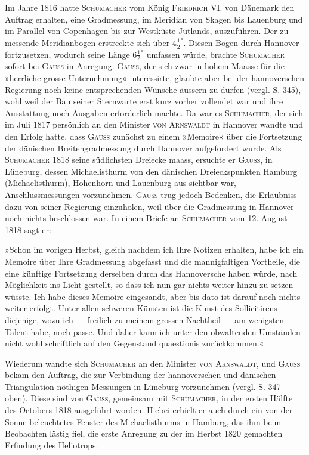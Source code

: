\par\noindent\hspace*{\parindent}Im Jahre 1816 hatte \textsc{Schumacher} vom König \textsc{Friedrich} VI. von Dänemark den Auftrag erhalten, eine Gradmessung, im Meridian von Skagen bis Lauenburg und im Parallel von Copenhagen bis zur Westküste Jütlands, auszuführen. Der zu messende Meridianbogen erstreckte sich über $4\frac12^\circ$. Diesen Bogen durch Hannover fortzusetzen, wodurch seine Länge $6\frac12^\circ$ umfassen würde, brachte \textsc{Schumacher} sofort bei \textsc{Gauss} in Anregung. \textsc{Gauss}, der sich zwar in hohem Maasse für die »herrliche grosse Unternehmung« interessirte, glaubte aber bei der hannoverschen Regierung noch keine entsprechenden Wünsche äussern zu dürfen (vergl. S. 345), wohl weil der Bau seiner Sternwarte erst kurz vorher vollendet war und ihre Ausstattung noch Ausgaben erforderlich machte. Da war es \textsc{Schumacher}, der sich im Juli 1817 persönlich an den Minister \textsc{von Arnswaldt} in Hannover wandte und den Erfolg hatte, dass \textsc{Gauss} zunächst zu einem »Memoire« über die Fortsetzung der dänischen Breitengradmessung durch Hannover aufgefordert wurde. Als \textsc{Schumacher} 1818 seine südlichsten Dreiecke maass, ersuchte er \textsc{Gauss}, in Lüneburg, dessen Michaelisthurm von den dänischen Dreieckspunkten Hamburg (Michaelisthurm), Hohenhorn und Lauenburg aus sichtbar war, Anschlussmessungen vorzunehmen. \textsc{Gauss} trug jedoch Bedenken, die Erlaubniss dazu von seiner Regierung einzuholen, weil über die Gradmessung in Hannover noch nichts beschlossen war. In einem Briefe an \textsc{Schumacher} vom 12. August 1818 sagt er:

\par\noindent\hspace*{\parindent}»Schon im vorigen Herbst, gleich nachdem ich Ihre Notizen erhalten, habe ich ein Memoire über Ihre Gradmessung abgefasst und die mannigfaltigen Vortheile, die eine künftige Fortsetzung derselben durch das Hannoversche haben würde, nach Möglichkeit ins Licht gestellt, so dass ich nun gar nichts weiter hinzu zu setzen wüsste. Ich habe dieses Memoire eingesandt, aber bis dato ist darauf noch nichts weiter erfolgt. Unter allen schweren Künsten ist die Kunst des Sollicitirens diejenige, wozu ich --- freilich zu meinem grossen Nachtheil --- am wenigsten Talent habe, noch passe. Und daher kann ich unter den obwaltenden Umständen nicht wohl schriftlich auf den Gegenstand quaestionis zurückkommen.«

\par\noindent\hspace*{\parindent}Wiederum wandte sich \textsc{Schumacher} an den Minister \textsc{von Arnswaldt}, und \textsc{Gauss} bekam den Auftrag, die zur Verbindung der hannoverschen und dänischen Triangulation nöthigen Messungen in Lüneburg vorzunehmen (vergl. S. 347 oben). Diese sind von \textsc{Gauss}, gemeinsam mit \textsc{Schumacher}, in der ersten Hälfte des Octobers 1818 ausgeführt worden. Hiebei erhielt er auch durch ein von der Sonne beleuchtetes Fenster des Michaelisthurms in Hamburg, das ihm beim Beobachten lästig fiel, die erste Anregung zu der im Herbst 1820 gemachten Erfindung des Heliotrops.

